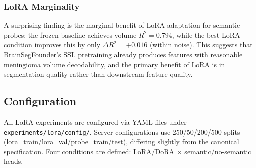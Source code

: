 \subsubsection{LoRA Marginality}

A surprising finding is the marginal benefit of LoRA adaptation for semantic
probes: the frozen baseline achieves volume $R^2 = 0.794$, while the best
LoRA condition improves this by only $\Delta R^2 = +0.016$ (within noise).
This suggests that BrainSegFounder's SSL pretraining already produces
features with reasonable meningioma volume decodability, and the primary
benefit of LoRA is in segmentation quality rather than downstream feature
quality.

\subsection{Configuration}
\label{sec:lora:config}

All LoRA experiments are configured via YAML files under
\texttt{experiments/lora/config/}. Server configurations use 250/50/200/500
splits (lora\_train/lora\_val/probe\_train/test), differing slightly from the
canonical specification. Four conditions are defined:
LoRA/DoRA $\times$ semantic/no-semantic heads.
